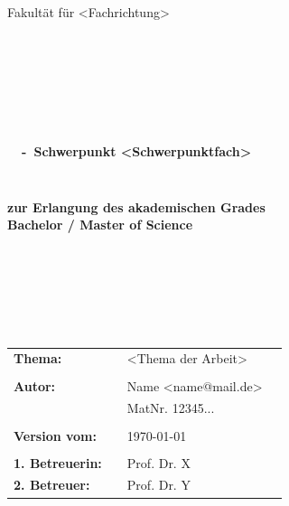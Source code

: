 \begin{center}
\Large{Fakultät für <Fachrichtung>}
\end{center}
\begin{verbatim}




\end{verbatim}
\begin{center}
\doublespacing
\textbf{\LARGE{\titleDocument}}\\
\singlespacing
\begin{verbatim}

\end{verbatim}
\textbf{{~\subjectDocument~-~Schwerpunkt <Schwerpunktfach>}}
\end{center}
\begin{verbatim}

\end{verbatim}
\begin{center}

\end{center}
\begin{verbatim}

\end{verbatim}
\begin{center}
\textbf{zur Erlangung des akademischen Grades \\ Bachelor / Master of Science}
\end{center}
\begin{verbatim}






\end{verbatim}
\begin{flushleft}
\begin{tabular}{llll}
\textbf{Thema:} & & <Thema der Arbeit> & \\
& & \\
\textbf{Autor:} & & Name <name@mail.de>& \\
& & MatNr. 12345... & \\
& & \\
\textbf{Version vom:} & & \today &\\
& & \\
\textbf{1. Betreuerin:} & & Prof. Dr. X &\\
\textbf{2. Betreuer:} & & Prof. Dr. Y &\\
\end{tabular}
\end{flushleft}